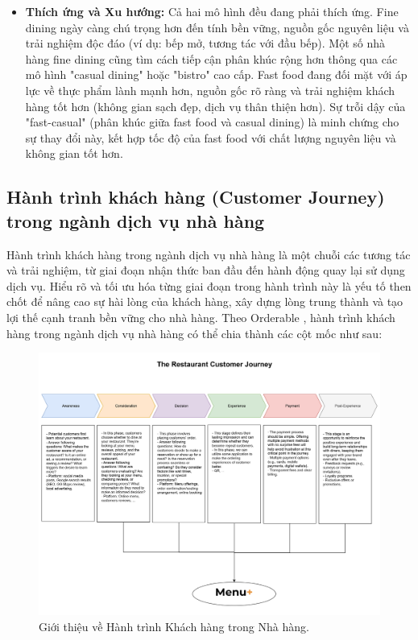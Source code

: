 \begin{itemize}
    \item \textbf{Thích ứng và Xu hướng:} Cả hai mô hình đều đang phải thích ứng. Fine dining ngày càng chú trọng hơn đến tính bền vững, nguồn gốc nguyên liệu và trải nghiệm độc đáo (ví dụ: bếp mở, tương tác với đầu bếp). Một số nhà hàng fine dining cũng tìm cách tiếp cận phân khúc rộng hơn thông qua các mô hình "casual dining" hoặc "bistro" cao cấp. Fast food đang đối mặt với áp lực về thực phẩm lành mạnh hơn, nguồn gốc rõ ràng và trải nghiệm khách hàng tốt hơn (không gian sạch đẹp, dịch vụ thân thiện hơn). Sự trỗi dậy của "fast-casual" (phân khúc giữa fast food và casual dining) là minh chứng cho sự thay đổi này, kết hợp tốc độ của fast food với chất lượng nguyên liệu và không gian tốt hơn.

\end{itemize}

\subsection{Hành trình khách hàng (Customer Journey) trong ngành dịch vụ nhà hàng}

Hành trình khách hàng trong ngành dịch vụ nhà hàng là một chuỗi các tương tác và trải nghiệm, từ giai đoạn nhận thức ban đầu đến hành động quay lại sử dụng dịch vụ. Hiểu rõ và tối ưu hóa từng giai đoạn trong hành trình này là yếu tố then chốt để nâng cao sự hài lòng của khách hàng, xây dựng lòng trung thành và tạo lợi thế cạnh tranh bền vững cho nhà hàng. Theo Orderable \cite{Orderable}, hành trình khách hàng trong ngành dịch vụ nhà hàng có thể chia thành các cột mốc như sau:

\begin{figure}[H]
    \centering
    \includegraphics[width=15cm]{Images/restaurant-customer-journey.png}
    \caption{Giới thiệu về Hành trình Khách hàng trong Nhà hàng.}
    \label{fig:my_label}
\end{figure}

